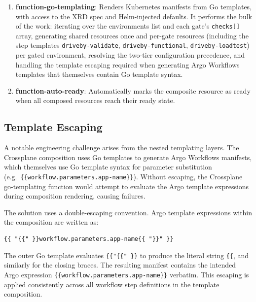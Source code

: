 \begin{enumerate}
    \item \textbf{function-go-templating}: Renders Kubernetes manifests from Go templates, with access to the XRD spec and Helm-injected defaults. It performs the bulk of the work: iterating over the environments list and each gate's \texttt{checks[]} array, generating shared resources once and per-gate resources (including the step templates \texttt{driveby-validate}, \texttt{driveby-functional}, \texttt{driveby-loadtest}) per gated environment, resolving the two-tier configuration precedence, and handling the template escaping required when generating Argo Workflows templates that themselves contain Go template syntax.
    \item \textbf{function-auto-ready}: Automatically marks the composite resource as ready when all composed resources reach their ready state.
\end{enumerate}

\subsection{Template Escaping}
\label{subsec:template-escaping}

A notable engineering challenge arises from the nested templating layers. The Crossplane composition uses Go templates to generate Argo Workflows manifests, which themselves use Go template syntax for parameter substitution (e.g.\ \texttt{\{\{workflow.parameters.app-name\}\}}). Without escaping, the Crossplane go-templating function would attempt to evaluate the Argo template expressions during composition rendering, causing failures.

The solution uses a double-escaping convention. Argo template expressions within the composition are written as:

\begin{verbatim}
{{ "{{" }}workflow.parameters.app-name{{ "}}" }}
\end{verbatim}

The outer Go template evaluates \verb|{{"{{" }}| to produce the literal string \verb|{{|, and similarly for the closing braces. The resulting manifest contains the intended Argo expression \verb|{{workflow.parameters.app-name}}| verbatim. This escaping is applied consistently across all workflow step definitions in the template composition.

